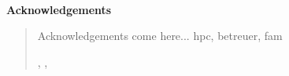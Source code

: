 
\newpage
\setcounter{page}{0}
\thispagestyle{empty}

~

\begin{center}
	\sffamily\bfseries\large Acknowledgements
\end{center}

\begin{quote}
\vspace{.1cm}

Acknowledgements come here...
hpc, betreuer, fam

\begin{flushright}
	\myplace, \@date, \@author
\end{flushright}

\end{quote}
 
\begin{center}
	\sffamily\large \phantom{Acknowledgements}
\end{center}

~

\newpage